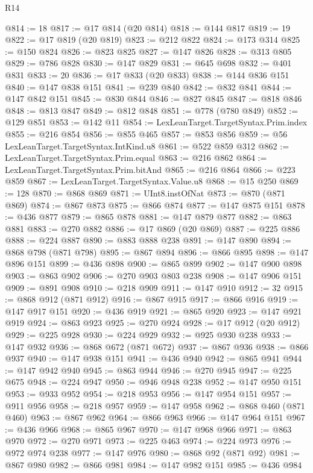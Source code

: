 \begin{lexlean}{R14}
\begin{coremodule}
@814 := 18
@817 := @17 @814 (@20 @814)
@818 := @144 @817
@819 := 19
@822 := @17 @819 (@20 @819)
@823 := @212 @822
@824 := @173 @314
@825 := @150 @824
@826 := @823 @825
@827 := @147 @826
@828 := @313 @805
@829 := @786 @828
@830 := @147 @829
@831 := @645 @698
@832 := @401 @831
@833 := 20
@836 := @17 @833 (@20 @833)
@838 := @144 @836 @151
@840 := @147 @838 @151
@841 := @239 @840
@842 := @832 @841
@844 := @147 @842 @151
@845 := @830 @844
@846 := @827 @845
@847 := @818 @846
@848 := @813 @847
@849 := @812 @848
@851 := @778 (@780 @849)
@852 := @129 @851
@853 := @142 @11
@854 := LexLeanTarget.TargetSyntax.Prim.index
@855 := @216 @854
@856 := @855 @465
@857 := @853 @856
@859 := @56 LexLeanTarget.TargetSyntax.IntKind.u8
@861 := @522 @859 @312
@862 := LexLeanTarget.TargetSyntax.Prim.equal
@863 := @216 @862
@864 := LexLeanTarget.TargetSyntax.Prim.bitAnd
@865 := @216 @864
@866 := @223 @859
@867 := LexLeanTarget.TargetSyntax.Value.u8
@868 := @15 @250
@869 := 128
@870 := @868 @869
@871 := UInt8.instOfNat
@873 := @870 (@871 @869)
@874 := @867 @873
@875 := @866 @874
@877 := @147 @875 @151
@878 := @436 @877
@879 := @865 @878
@881 := @147 @879 @877
@882 := @863 @881
@883 := @270 @882
@886 := @17 @869 (@20 @869)
@887 := @225 @886
@888 := @224 @887
@890 := @883 @888 @238
@891 := @147 @890
@894 := @868 @798 (@871 @798)
@895 := @867 @894
@896 := @866 @895
@898 := @147 @896 @151
@899 := @436 @898
@900 := @865 @899
@902 := @147 @900 @898
@903 := @863 @902
@906 := @270 @903 @803 @238
@908 := @147 @906 @151
@909 := @891 @908
@910 := @218 @909
@911 := @147 @910
@912 := 32
@915 := @868 @912 (@871 @912)
@916 := @867 @915
@917 := @866 @916
@919 := @147 @917 @151
@920 := @436 @919
@921 := @865 @920
@923 := @147 @921 @919
@924 := @863 @923
@925 := @270 @924
@928 := @17 @912 (@20 @912)
@929 := @225 @928
@930 := @224 @929
@932 := @925 @930 @238
@933 := @147 @932
@936 := @868 @672 (@871 @672)
@937 := @867 @936
@938 := @866 @937
@940 := @147 @938 @151
@941 := @436 @940
@942 := @865 @941
@944 := @147 @942 @940
@945 := @863 @944
@946 := @270 @945
@947 := @225 @675
@948 := @224 @947
@950 := @946 @948 @238
@952 := @147 @950 @151
@953 := @933 @952
@954 := @218 @953
@956 := @147 @954 @151
@957 := @911 @956
@958 := @218 @957
@959 := @147 @958
@962 := @868 @460 (@871 @460)
@963 := @867 @962
@964 := @866 @963
@966 := @147 @964 @151
@967 := @436 @966
@968 := @865 @967
@970 := @147 @968 @966
@971 := @863 @970
@972 := @270 @971
@973 := @225 @463
@974 := @224 @973
@976 := @972 @974 @238
@977 := @147 @976
@980 := @868 @92 (@871 @92)
@981 := @867 @980
@982 := @866 @981
@984 := @147 @982 @151
@985 := @436 @984

\end{coremodule}
\end{lexlean}
